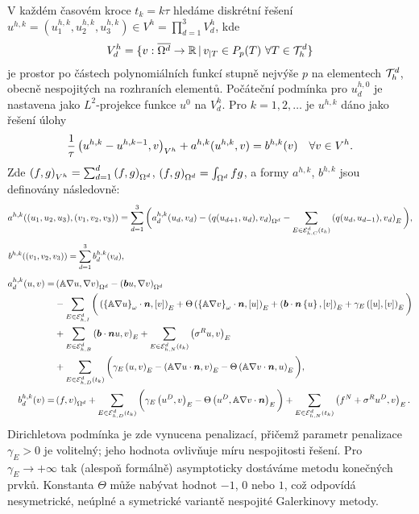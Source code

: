V každém časovém kroce $t_k=k\tau$ hledáme diskrétní řešení $u^{h,k}=(u_1^{h,k},u_2^{h,k},u_3^{h,k})\in V^h=\prod_{d=1}^3 V_d^h$, kde
$$ V_d^h = \{v:\overline{\Omega^d}\to\R\where v_{|T}\in P_p(T)~\forall T\in\Th^d\} $$
je prostor po částech polynomiálních funkcí stupně nejvýše $p$ na elementech $\Th^d$, obecně nespojitých na rozhraních elementů.
Počáteční podmínka pro $u_d^{h,0}$ je nastavena jako $L^2$-projekce funkce $u^0$ na $V_d^h$.
Pro $k=1,2,\ldots$ je $u^{h,k}$ dáno jako řešení úlohy
\begin{equation*}
\frac1\tau\sc{u^{h,k}-u^{h,k-1}}{v}_{V^h} + a^{h,k}(u^{h,k},v) = b^{h,k}(v) \quad \forall v\in V^h.
\end{equation*}
Zde $\sc{f}{g}_{V^h}=\sum_{d=1}^d\sc{f}{g}_{\Omega^d}$, $\sc{f}{g}_{\Omega^d}=\int_{\Omega^d} f g$, a formy $a^{h,k}$, $b^{h,k}$ jsou definovány následovně:
\[
a^{h,k}((u_1,u_2,u_3),(v_1,v_2,v_3)) = \sum_{d=1}^3\bigg( a^{h,k}_d(u_d,v_d) - \sc{q(u_{d+1},u_d)}{v_d}_{\Omega^d}
- \sum_{E\in\Ehcom^d(t_k)}\sc{q(u_d,u_{d-1})}{v_d}_E \bigg),
\]
\[ b^{h,k}((v_1,v_2,v_3)) = \sum_{d=1}^3 b^{h,k}_d(v_d), \mbox{\hspace{11.7cm}} \]
\begin{align*}
a^{h,k}_d(u,v) = &\sc{\tn A\nabla u}{\nabla v}_{\Omega^d}
- \sc{\bb u}{\nabla v}_{\Omega^d}\\
&- \sum_{E\in\Ehint^d}\bigg(\sc{\wavg{\tn A\nabla u}\cdot\n}{\jmp{v}}_E + \Theta\sc{\wavg{\tn A\nabla v}\cdot\n}{\jmp{u}}_E
+ \sc{\bb\cdot\n\avg{u}}{\jmp{v}}_E
+ \gamma_E\sc{\jmp{u}}{\jmp{v}}_E\bigg)\\
&+ \sum_{E\in\Ehb^d}\sc{\bb\cdot\n u}{v}_E
+ \sum_{E\in\Ehneu^d(t_k)}\sc{\sigma^R u}{v}_E\\
&+ \sum_{E\in\Ehdir^d(t_k)}\bigg(\gamma_E\sc{u}{v}_E - \sc{\tn A\nabla u\cdot\nn}{v}_E - \Theta\sc{\tn A\nabla v\cdot\nn}{u}_E\bigg),\\
% 
b^{h,k}_d(v) = &\sc{f}{v}_{\Omega^d} + \sum_{E\in\Ehdir^d(t_k)}\bigg(\gamma_E\sc{u^D}{v}_E - \Theta\sc{u^D}{\tn A\nabla v\cdot\nn}_E\bigg)
+ \sum_{E\in\Ehneu^d(t_k)}\sc{f^N+\sigma^R u^D}{v}_E.
\end{align*}
Dirichletova podmínka je zde vynucena penalizací, přičemž parametr penalizace $\gamma_E>0$ je volitelný; jeho hodnota ovlivňuje míru nespojitosti řešení. Pro $\gamma_E\to+\infty$ tak (alespoň formálně) asymptoticky dostáváme metodu konečných prvků.
Konstanta $\Theta$ může nabývat hodnot $-1$, $0$ nebo $1$, což odpovídá nesymetrické, neúplné a symetrické variantě nespojité Galerkinovy metody.

